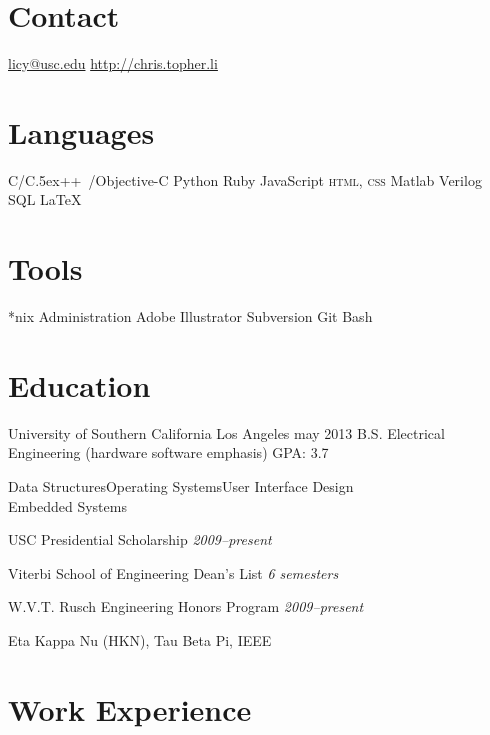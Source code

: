 \documentclass[print]{friggeri-cv}
\def\Cplusplus{{\rm C\raise.5ex\hbox{\small ++}}~}
\begin{document}
       {}


\begin{aside}
  \section{Contact}
    \href{mailto:licy@usc.edu}{licy@usc.edu}
    \href{http://chris.topher.li}{http://chris.topher.li}
  \section{Languages}
    C/\Cplusplus/Objective-C
    Python
    Ruby
    JavaScript
    \textsc{html}, \textsc{css}
    {\sc Matlab}
    Verilog
    SQL
    \LaTeX
  \section{Tools}
    *nix Administration
    Adobe Illustrator
    Subversion
    Git
    Bash
\end{aside}

\section{Education}

\education
  {University of Southern California}
  {Los Angeles}
  {may 2013}
  {
  B.S. Electrical Engineering (hardware software emphasis) \Space GPA: 3.7
  }

\vspace{-1.0em}
\begin{entrylist}
  {
  Data Structures\Space Operating Systems\Space User Interface Design\\Embedded Systems
  }
  
  {
    USC Presidential Scholarship \hfill \textit{2009--present}
    
    Viterbi School of Engineering Dean's List \hfill \textit{6 semesters}
    
    W.V.T. Rusch Engineering Honors Program \hfill \textit{2009--present}
  }
  
  {
    Eta Kappa Nu (HKN), Tau Beta Pi, IEEE
  }
  
\end{entrylist}

\section{Work Experience}
\end{document}
